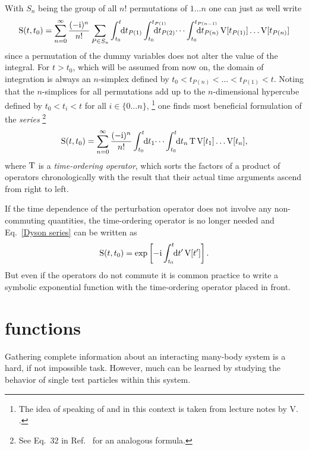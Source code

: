 With $S_n$ being the group of all $n!$ permutations of $1 \dots n$ one can just
as well write
%
\begin{equation*}
    \op S(t, t_0) = \sum_{n = 0}^\infty \frac{(-\I)^n}{n!} \sum_{P \in S_n}
    \int \from{t_0} \till t \D t_{P(1)}
    \int \from{t_0} \till{t_{P(1)}} \D t_{P(2)} \dots
    \int \from{t_0} \till{t_{P(n - 1)}} \D t_{P(n)} \,
    \op V[t_{P(1)}] \dots \op V[t_{P(n)}]
\end{equation*}
%
since a permutation of the dummy variables does not alter the value of the
integral. For $t > t_0$, which will be assumed from now on, the domain of
integration is always an $n$-simplex defined by $t_0 < t_{P(n)} < \dots <
t_{P(1)} < t$. Noting that the $n$-simplices for all permutations add up to the
$n$-dimensional hypercube defined by $t_0 < t_i < t$ for all $i \in \{ 0 \dots n
\}$,%
%
\footnote{The idea of speaking of  and  in this
context is taken from lecture notes by V. .}
%
one finds most beneficial formulation of the \emph{ series}%
%
\footnote{See Eq.~32 in Ref.~ for an analogous formula.}
%
\begin{equation} \label{Dyson series}
    \op S(t, t_0) = \sum_{n = 0}^\infty \frac{(-\I)^n}{n!}
    \int \from{t_0} \till t \D t_1 \dots
    \int \from{t_0} \till t \D t_n \,
    \op T \, \op V[t_1] \dots \op V[t_n],
\end{equation}
%
where $\mathrm T$ is a \emph{time-ordering operator}, which sorts the factors of a
product of operators chronologically with the result that their actual time
arguments ascend from right to left.

If the time dependence of the perturbation operator does not involve any
non-commuting quantities, the time-ordering operator is no longer needed and
Eq.~\ref{Dyson series} can be written as
%
\begin{equation*}
    \op S(t, t_0) = \exp \left[
        -\I \int \from{t_0} \till t \D t' \, \op V[t'] \right].
\end{equation*}
%
But even if the operators do not commute it is common practice to write a
symbolic exponential function with the time-ordering operator placed in front.

\section{ functions}

Gathering complete information about an interacting many-body system is a hard,
if not impossible task. However, much can be learned by studying the behavior of
single test particles within this system.

